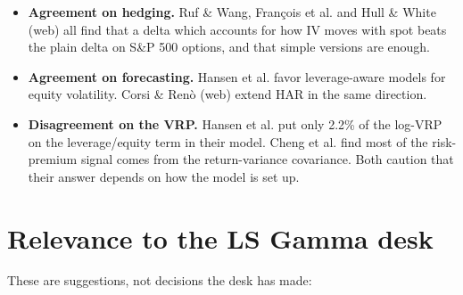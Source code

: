 \documentclass{article}
\begin{document}
\begin{itemize}

\item \textbf{Agreement on hedging.} Ruf \& Wang, François et al. and Hull \& White (web) all find that a delta which accounts for how IV moves with spot beats the plain delta on S\&P 500 options, and that simple versions are enough.

\item \textbf{Agreement on forecasting.} Hansen et al. favor leverage-aware models for equity volatility. Corsi \& Renò (web) extend HAR in the same direction.

\item \textbf{Disagreement on the VRP.} Hansen et al. put only 2.2\% of the log-VRP on the leverage/\allowbreak{}equity term in their model. Cheng et al. find most of the risk-premium signal comes from the return-variance covariance. Both caution that their answer depends on how the model is set up.

\end{itemize}

\section{Relevance to the LS Gamma desk}

These are suggestions, not decisions the desk has made:
\end{document}
